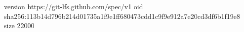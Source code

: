 version https://git-lfs.github.com/spec/v1
oid sha256:113b14d796b214d01735a1f9e1ff680473cdd1c9f9e912a7e20cd3df6b1f19e8
size 22000
